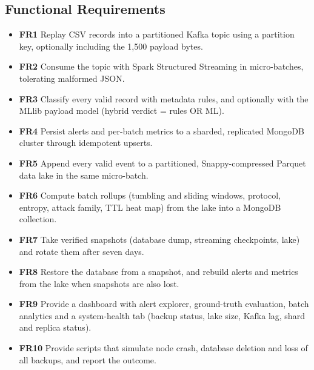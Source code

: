 \subsection{Functional Requirements}
\begin{itemize}[noitemsep]
\item \textbf{FR1} Replay CSV records into a partitioned Kafka topic using a partition key, optionally including the 1,500 payload bytes.
\item \textbf{FR2} Consume the topic with Spark Structured Streaming in micro-batches, tolerating malformed JSON.
\item \textbf{FR3} Classify every valid record with metadata rules, and optionally with the MLlib payload model (hybrid verdict = rules OR ML).
\item \textbf{FR4} Persist alerts and per-batch metrics to a sharded, replicated MongoDB cluster through idempotent upserts.
\item \textbf{FR5} Append every valid event to a partitioned, Snappy-compressed Parquet data lake in the same micro-batch.
\item \textbf{FR6} Compute batch rollups (tumbling and sliding windows, protocol, entropy, attack family, TTL heat map) from the lake into a MongoDB collection.
\item \textbf{FR7} Take verified snapshots (database dump, streaming checkpoints, lake) and rotate them after seven days.
\item \textbf{FR8} Restore the database from a snapshot, and rebuild alerts and metrics from the lake when snapshots are also lost.
\item \textbf{FR9} Provide a dashboard with alert explorer, ground-truth evaluation, batch analytics and a system-health tab (backup status, lake size, Kafka lag, shard and replica status).
\item \textbf{FR10} Provide scripts that simulate node crash, database deletion and loss of all backups, and report the outcome.
\end{itemize}


